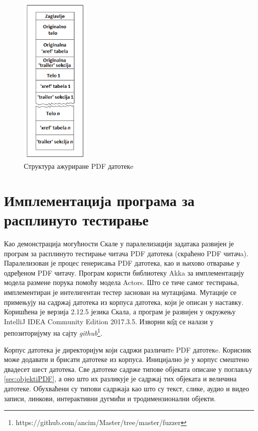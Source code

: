 \documentclass[12pt,oneside]{memoir}
\begin{document}
\begin{figure}[t!]
\centering
\includegraphics[width=0.3\textwidth]{pdfStruktura2.png}
\caption{Структура ажуриране PDF датотекe}
\label{fig:pdfStruktura2}
\end{figure}

\chapter{Имплементација програма за расплинуто тестирање}
\label{chp:implementacija}

Као демонстрација могућности Скале у паралелизацији задатака развијен је програм за расплинуто тестирање читача PDF датотека (скраћено PDF читачa). Паралелизован је процес генерисања PDF датотека, као и њихово отварање у одређеном PDF читачу. Програм користи библиотеку Akka за имплементацију модела размене порука помоћу модела Actors. Што се тиче самог тестирања, имплементиран је интелигентан тестер заснован на мутацијама. Мутације се примењују на садржај датотека из корпуса датотека, који је описан у наставку. Коришћена је верзија 2.12.5 језика Скала, а програм је развијен у окружењу IntelliJ IDEA Community Edition 2017.3.5. Изворни к\^{о}д се налази у репозиторијуму на сајту \textit{github}\footnote{https://github.com/ancim/Master/tree/master/fuzzer}.

Корпус датотека је директоријум који садржи различитe PDF датотекe. Корисник може додавати и брисати датотеке из корпуса. Иницијално је у корпус смештено двадесет шест датотека. Све датотеке садрже типове објеката описане у поглављу \ref{sec:objektiPDF}, а оно што их разликује је садржај тих објеката и величина датотеке. Обухваћени су типови садржаја као што су текст, слике, аудио и видео записи, линкови, интерактивни дугмићи и тродимензионални објекти. 
\end{document}
